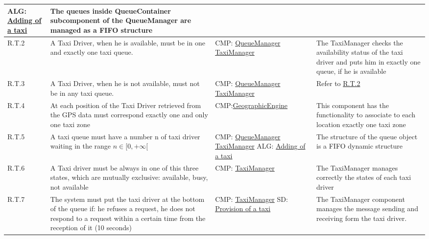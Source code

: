 \begin{center}
\begin{longtable}{|p{}|p{}|>{\raggedright\arraybackslash}p{}|>{\raggedright\arraybackslash}p{}|}
ALG: \linebreak \hyperref[alg:addingOfATaxi]{Adding of a taxi} & The queues inside QueueContainer subcomponent of the QueueManager are managed as a FIFO structure\\ \hline 
R.T.2\label{R.T.2} & A Taxi Driver, when he is available, must be in one and exactly one taxi queue. & CMP: \linebreak \hyperref[comp:queueManager]{QueueManager} \linebreak \hyperref[comp:taxiManager]{TaxiManager} & The TaxiManager checks the availability status of the taxi driver and puts him in exactly one queue, if he is available \\ \hline
R.T.3 & A Taxi Driver, when he is not available, must not be in any taxi queue. & CMP: \linebreak \hyperref[comp:queueManager]{QueueManager} \linebreak \hyperref[comp:taxiManager]{TaxiManager} & Refer to \hyperref[R.T.2]{R.T.2}  \\ \hline
R.T.4 \label{R.T.4} & At each position of the Taxi Driver retrieved from the GPS data must correspond exactly one and only one taxi zone & CMP:\linebreak \hyperref[comp:geographicEngine]{GeographicEngine} & This component has the functionality to associate to each location exactly one taxi zone \\ \hline
R.T.5 & A taxi queue must have a number n of taxi driver waiting in the range $n \in [0, +\infty[$ & CMP: \linebreak \hyperref[comp:queueManager]{QueueManager} \linebreak \hyperref[comp:taxiManager]{TaxiManager} \linebreak ALG: \linebreak
\hyperref[alg:addingOfATaxi]{Adding of a taxi} & The structure of the queue object is a FIFO dynamic structure \\ \hline
R.T.6 & A Taxi driver must be always in one of this three states, which are mutually exclusive: available, busy, not available & CMP: \linebreak \hyperref[comp:taxiManager]{TaxiManager} & The TaxiManager manages correctly the states of each taxi driver \\ \hline
R.T.7 & The system must put the taxi driver at the bottom of the queue if: he refuses a request, he does not respond to a request within a certain time from the reception of it (10 seconds) & CMP: \linebreak \hyperref[comp:taxiManager]{TaxiManager} \linebreak SD: \linebreak \hyperref[seq:provisionOfATaxi]{Provision of a taxi} & The TaxiManager component manages the message sending and receiving form the taxi driver. \\ \hline

\end{longtable}
\end{center}
